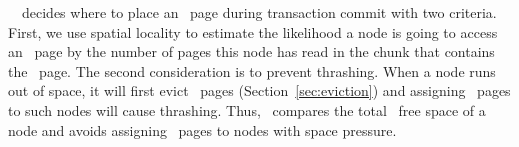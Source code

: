 \hotpot\ \on\ decides where to place an \redundant\ page during transaction commit with two criteria. 
First, we use spatial locality to estimate the likelihood a node is going to access an \redundant\ page 
by the number of pages this node has read in the chunk that contains the \redundant\ page.
The second consideration is to prevent thrashing.
When a node runs out of space, it will first evict \redundant\ pages (Section~\ref{sec:eviction})
and assigning \redundant\ pages to such nodes will cause thrashing.
Thus, \hotpot\ compares the total \nvm\ free space of a node and avoids assigning 
\redundant\ pages to nodes with space pressure.
\fi
